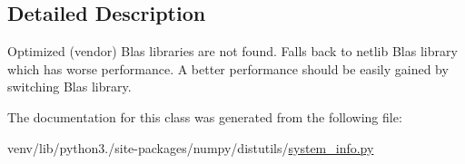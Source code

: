 \subsection{Detailed Description}
\begin{DoxyVerb}Optimized (vendor) Blas libraries are not found.
Falls back to netlib Blas library which has worse performance.
A better performance should be easily gained by switching
Blas library.\end{DoxyVerb}
 

The documentation for this class was generated from the following file\+:\begin{DoxyCompactItemize}
\item 
venv/lib/python3./site-\/packages/numpy/distutils/\hyperlink{system__info_8py}{system\+\_\+info.\+py}\end{DoxyCompactItemize}
